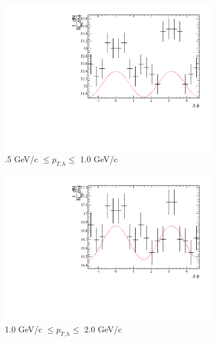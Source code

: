 \begin{figure}[htbp]
	\begin{subfigure}{0.5\textwidth}
		\includegraphics[width=\textwidth]{Plots/Correlations/raw/NPE_eh_corr_raw_primpt_4_5_cent_7_8_assopt_1_1.pdf}
		\caption{.5 GeV/c $\leq p_{T,h} \leq$ 1.0 GeV/c}
		\label{fig:Raw010a}
	\end{subfigure}	
	\begin{subfigure}{0.5\textwidth}
		\includegraphics[width=\textwidth]{Plots/Correlations/raw/NPE_eh_corr_raw_primpt_4_5_cent_7_8_assopt_2_2.pdf}
		\caption{1.0 GeV/c $\leq p_{T,h} \leq$ 2.0 GeV/c}
		\label{fig:Raw010b}
	\end{subfigure}	
\begin{center}
	\begin{subfigure}{0.5\textwidth}

\end{subfigure}
\end{center}
\end{figure}
